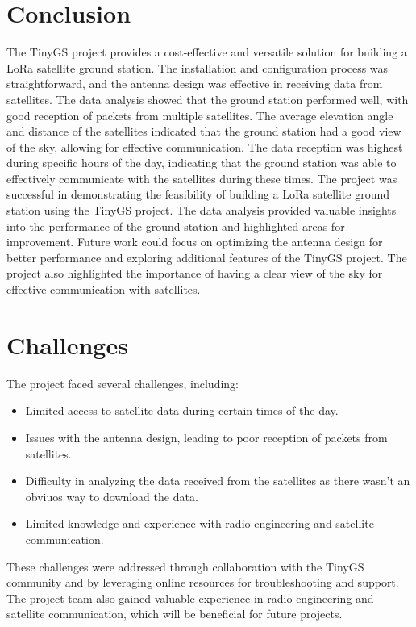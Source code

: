 \documentclass[12pt,a4paper]{article}
\begin{document}
\section{Conclusion}
The TinyGS project provides a cost-effective and versatile solution for building a LoRa satellite ground station. The installation and configuration process was straightforward, and the antenna design was effective in receiving data from satellites. The data analysis showed that the ground station performed well, with good reception of packets from multiple satellites.
The average elevation angle and distance of the satellites indicated that the ground station had a good view of the sky, allowing for effective communication. The data reception was highest during specific hours of the day, indicating that the ground station was able to effectively communicate with the satellites during these times.
The project was successful in demonstrating the feasibility of building a LoRa satellite ground station using the TinyGS project. The data analysis provided valuable insights into the performance of the ground station and highlighted areas for improvement.
Future work could focus on optimizing the antenna design for better performance and exploring additional features of the TinyGS project. The project also highlighted the importance of having a clear view of the sky for effective communication with satellites.
\section{Challenges}
The project faced several challenges, including:
\begin{itemize}
    \item Limited access to satellite data during certain times of the day.
    \item Issues with the antenna design, leading to poor reception of packets from satellites.
    \item Difficulty in analyzing the data received from the satellites as there wasn't an obviuos way to download the data.
    \item Limited knowledge and experience with radio engineering and satellite communication.
\end{itemize}
These challenges were addressed through collaboration with the TinyGS community and by leveraging online resources for troubleshooting and support. The project team also gained valuable experience in radio engineering and satellite communication, which will be beneficial for future projects.
\end{document}
